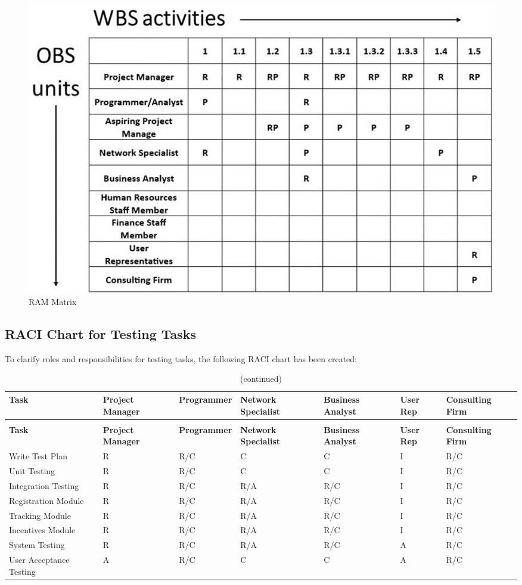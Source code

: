 \begin{figure}[ht]
    \includegraphics[width=\textwidth]{images/ram.png}
    \caption{RAM Matrix}
    \label{fig:ram}
\end{figure}

\subsection{RACI Chart for Testing Tasks}

To clarify roles and responsibilities for testing tasks, the following RACI chart has been created:

\begin{longtable}{|p{2cm}|p{2cm}|p{2cm}|p{2cm}|p{2cm}|p{2cm}|p{2cm}|}
\caption{RACI Chart for Testing Tasks}
\label{tab:raci_testing} \\
\hline
\rowcolor{lightgray} \textbf{Task} & \textbf{Project Manager} & \textbf{Programmer} & \textbf{Network Specialist} & \textbf{Business Analyst} & \textbf{User Rep} & \textbf{Consulting Firm} \\
\hline
\endfirsthead
\caption[]{(continued)} \\
\hline
\rowcolor{lightgray} \textbf{Task} & \textbf{Project Manager} & \textbf{Programmer} & \textbf{Network Specialist} & \textbf{Business Analyst} & \textbf{User Rep} & \textbf{Consulting Firm} \\
\hline
\endhead
\hline
\endfoot
\hline
\endlastfoot
Write Test Plan & R & R/C & C & C & I & R/C \\
\hline
Unit Testing & R  & R/C & C & C & I & R/C \\
\hline
Integration Testing & R  & R/C & R/A & R/C & I & R/C \\
\hline
Registration Module & R  & R/C & R/A & R/C & I & R/C \\
\hline
Tracking Module & R  & R/C & R/A & R/C & I & R/C \\
\hline
Incentives Module & R & R/C & R/A & R/C & I & R/C \\
\hline
System Testing & R  & R/C & R/A & R/C & A & R/C \\
\hline
User Acceptance Testing & A & R/C & C & C & A & R/C \\
\hline
\end{longtable}


\FloatBarrier
\newpage